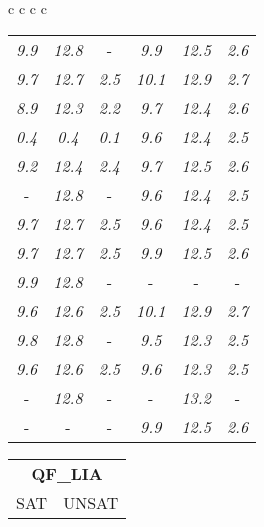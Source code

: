 \documentclass[sigplan,screen]{acmart}
\makeatletter
\newcommand{\ccell}[3][]{%
  \kern-\fboxsep
  \if\relax\detokenize{#1}\relax
    \expandafter\@firstoftwo
  \else
    \expandafter\@secondoftwo
  \fi
  {\colorbox{#2}}%
  {\colorbox[#1]{#2}}%
  {#3}\kern-\fboxsep
}
\makeatother
\begin{document}
\begin{table*}
\begin{tabular}{c c c c}
\begin{tabular}{c c c c c c}
      \rule{0pt}{4ex}    
      
      \textit{9.9} & \textit{12.8} &  \ccell[gray]{0.9}{\textit{2.6}} & \textit{9.9} & \textit{12.5} & \textit{2.6} \\
      \textit{9.7} & \textit{12.7} & \textit{2.5} & \textit{10.1} & \textit{12.9} & \textit{2.7} \\
      \textit{8.9} & \textit{12.3} & \textit{2.2} & \textit{9.7} & \textit{12.4} & \textit{2.6} \\
      \textit{0.4} & \textit{0.4} & \textit{0.1} & \textit{9.6} & \textit{12.4} & \textit{2.5} \\
      \textit{9.2} & \textit{12.4} & \textit{2.4} & \textit{9.7} & \textit{12.5} & \textit{2.6} \\
       \ccell[gray]{0.9}{\textit{10.0}} & \textit{12.8} &  \ccell[gray]{0.9}{\textit{2.6}} & \textit{9.6} & \textit{12.4} & \textit{2.5} \\
      \textit{9.7} & \textit{12.7} & \textit{2.5} & \textit{9.6} & \textit{12.4} & \textit{2.5} \\
      \textit{9.7} & \textit{12.7} & \textit{2.5} & \textit{9.9} & \textit{12.5} & \textit{2.6} \\
      \textit{9.9} & \textit{12.8} &  \ccell[gray]{0.9}{\textit{2.6}} &  \ccell[gray]{0.9}{\textit{10.5}} &  \ccell[gray]{0.9}{\textit{13.4}} &  \ccell[gray]{0.9}{\textit{2.8}} \\
      \textit{9.6} & \textit{12.6} & \textit{2.5} & \textit{10.1} & \textit{12.9} & \textit{2.7} \\
      \textit{9.8} & \textit{12.8} &  \ccell[gray]{0.9}{\textit{2.6}} & \textit{9.5} & \textit{12.3} & \textit{2.5} \\
      \textit{9.6} & \textit{12.6} & \textit{2.5} & \textit{9.6} & \textit{12.3} & \textit{2.5} \\
       \ccell[gray]{0.9}{\textit{10.0}} & \textit{12.8} &  \ccell[gray]{0.9}{\textit{2.6}} &  \ccell[gray]{0.9}{\textit{10.5}} & \textit{13.2} &  \ccell[gray]{0.9}{\textit{2.8}} \\
       \ccell[gray]{0.9}{\textit{10.0}} &  \ccell[gray]{0.9}{\textit{12.9}} &  \ccell[gray]{0.9}{\textit{2.6}} & \textit{9.9} & \textit{12.5} & \textit{2.6} \\
\end{tabular}
\begin{tabular}{c c c c c c}
  \multicolumn{6}{c}{\textbf{QF\_LIA}} \\
   \cline{2-5}
  \multicolumn{3}{c}{SAT} & \multicolumn{3}{c}{UNSAT} \\

\end{tabular}
\end{tabular}
\end{table*}
\end{document}
